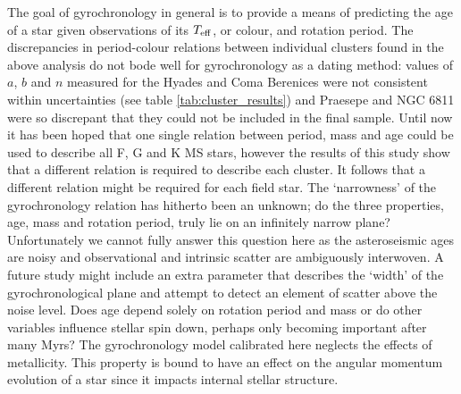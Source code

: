 \documentclass[useAMS, usenatbib]{mn2e}
\newcommand{\teff}{$T_{\rm{eff}}$}
\begin{document}

The goal of gyrochronology in general is to provide a means of predicting the
age of a star given observations of its \teff, or colour, and rotation period.
The discrepancies in period-colour relations between individual clusters found
in the above analysis do not bode well for gyrochronology as a dating method:
values of $a$, $b$ and $n$ measured for the Hyades and Coma Berenices were not
consistent within uncertainties (see table \ref{tab:cluster_results}) and
Praesepe and NGC 6811 were so discrepant that they could not be included in
the final sample.
Until now it has been hoped that one single relation between period, mass and
age could be used to describe all F, G and K MS stars, however the results of
this study show that a different relation is required to describe each
cluster.
It follows that a different relation might be required for each field star.
The `narrowness' of the gyrochronology relation has hitherto been an unknown;
do the three properties, age, mass and rotation period, truly lie on an
infinitely narrow plane?
Unfortunately we cannot fully answer this question here as the asteroseismic
ages are noisy and observational and intrinsic scatter are ambiguously
interwoven.
A future study might include an extra parameter that describes the `width' of
the gyrochronological plane and attempt to detect an element of scatter above
the noise level.
Does age depend solely on rotation period and mass or do other variables
influence stellar spin down, perhaps only becoming important after many Myrs?
The gyrochronology model calibrated here neglects the effects of metallicity.
This property is bound to have an effect on the angular momentum evolution
of a star since it impacts internal stellar structure.
\end{document}
